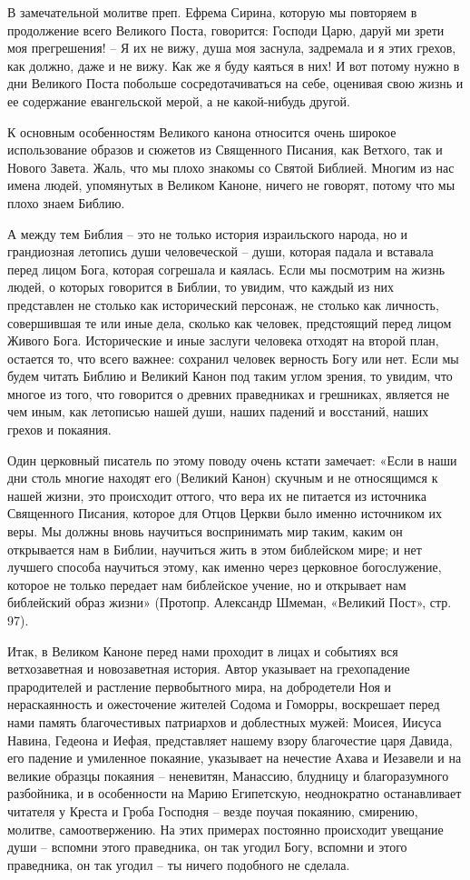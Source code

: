 В замечательной молитве преп. Ефрема Сирина, которую мы повторяем в продолжение всего Великого Поста, говорится: Господи Царю, даруй ми зрети моя прегрешения! – Я их не вижу, душа моя заснула, задремала и я этих грехов, как должно, даже и не вижу. Как же я буду каяться в них! И вот потому нужно в дни Великого Поста побольше сосредотачиваться на себе, оценивая свою жизнь и ее содержание евангельской мерой, а не какой-нибудь другой.


К основным особенностям Великого канона относится очень широкое использование образов и сюжетов из Священного Писания, как Ветхого, так и Нового Завета. Жаль, что мы плохо знакомы со Святой Библией. Многим из нас имена людей, упомянутых в Великом Каноне, ничего не говорят, потому что мы плохо знаем Библию.


А между тем Библия – это не только история израильского народа, но и грандиозная летопись души человеческой – души, которая падала и вставала перед лицом Бога, которая согрешала и каялась. Если мы посмотрим на жизнь людей, о которых говорится в Библии, то увидим, что каждый из них представлен не столько как исторический персонаж, не столько как личность, совершившая те или иные дела, сколько как человек, предстоящий перед лицом Живого Бога. Исторические и иные заслуги человека отходят на второй план, остается то, что всего важнее: сохранил человек верность Богу или нет. Если мы будем читать Библию и Великий Канон под таким углом зрения, то увидим, что многое из того, что говорится о древних праведниках и грешниках, является не чем иным, как летописью нашей души, наших падений и восстаний, наших грехов и покаяния.


Один церковный писатель по этому поводу очень кстати замечает: «Если в наши дни столь многие находят его (Великий Канон) скучным и не относящимся к нашей жизни, это происходит оттого, что вера их не питается из источника Священного Писания, которое для Отцов Церкви было именно источником их веры. Мы должны вновь научиться воспринимать мир таким, каким он открывается нам в Библии, научиться жить в этом библейском мире; и нет лучшего способа научиться этому, как именно через церковное богослужение, которое не только передает нам библейское учение, но и открывает нам библейский образ жизни» (Протопр. Александр Шмеман, «Великий Пост», стр. 97).


Итак, в Великом Каноне перед нами проходит в лицах и событиях вся ветхозаветная и новозаветная история. Автор указывает на грехопадение прародителей и растление первобытного мира, на добродетели Ноя и нераскаянность и ожесточение жителей Содома и Гоморры, воскрешает перед нами память благочестивых патриархов и доблестных мужей: Моисея, Иисуса Навина, Гедеона и Иефая, представляет нашему взору благочестие царя Давида, его падение и умиленное покаяние, указывает на нечестие Ахава и Иезавели и на великие образцы покаяния – неневитян, Манассию, блудницу и благоразумного разбойника, и в особенности на Марию Египетскую, неоднократно останавливает читателя у Креста и Гроба Господня – везде поучая покаянию, смирению, молитве, самоотвержению. На этих примерах постоянно происходит увещание души – вспомни этого праведника, он так угодил Богу, вспомни и этого праведника, он так угодил – ты ничего подобного не сделала.


